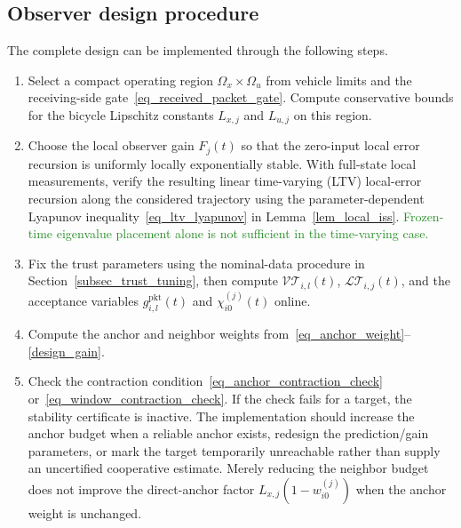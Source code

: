 \documentclass[letterpaper,journal]{IEEEtran}
\def\LT{\mathcal{LT}} %
\def\VT{\mathcal{VT}} %
\newcommand{\azrevcolor}{ForestGreen}
\newcommand{\azrev}[1]{\textcolor{\azrevcolor}{#1}}
\begin{document}
\subsection{Observer design procedure}
The complete design can be implemented through the following steps.
\begin{enumerate}
    \item Select a compact operating region $\Omega_x\times\Omega_u$ from vehicle limits and the receiving-side gate~\eqref{eq_received_packet_gate}. Compute conservative bounds for the bicycle Lipschitz constants $L_{x,j}$ and $L_{u,j}$ on this region.
    \item Choose the local observer gain $F_j(t)$ so that the zero-input local error recursion is uniformly locally exponentially stable. With full-state local measurements, verify the resulting linear time-varying (LTV) local-error recursion along the considered trajectory using the parameter-dependent Lyapunov inequality~\eqref{eq_ltv_lyapunov} in Lemma~\ref{lem_local_iss}. \azrev{Frozen-time eigenvalue placement alone is not sufficient in the time-varying case.}
    \item Fix the trust parameters using the nominal-data procedure in Section~\ref{subsec_trust_tuning}, then compute $\VT_{i,l}(t)$, $\LT_{i,j}(t)$, and the acceptance variables $g_{i,l}^{\mathrm{pkt}}(t)$ and $\chi_{i0}^{(j)}(t)$ online.
    \item Compute the anchor and neighbor weights from~\eqref{eq_anchor_weight}--\eqref{design_gain}. 
    \item Check the contraction condition~\eqref{eq_anchor_contraction_check} or~\eqref{eq_window_contraction_check}. If the check fails for a target, the stability certificate is inactive. The implementation should increase the anchor budget when a reliable anchor exists, redesign the prediction/gain parameters, or mark the target temporarily unreachable rather than supply an uncertified cooperative estimate. Merely reducing the neighbor budget does not improve the direct-anchor factor $L_{x,j}(1-w_{i0}^{(j)})$ when the anchor weight is unchanged.
\end{enumerate}
\end{document}
